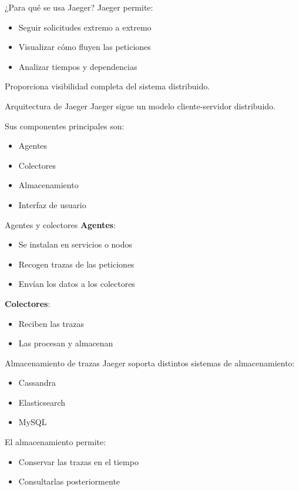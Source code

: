 \documentclass{beamer}
\begin{document}
\begin{frame}{¿Para qué se usa Jaeger?}
Jaeger permite:
\begin{itemize}
    \item Seguir solicitudes extremo a extremo
    \item Visualizar cómo fluyen las peticiones
    \item Analizar tiempos y dependencias
\end{itemize}

\vspace{0.3cm}
Proporciona visibilidad completa del sistema distribuido.
\end{frame}

\begin{frame}{Arquitectura de Jaeger}
Jaeger sigue un modelo cliente-servidor distribuido.

\vspace{0.3cm}
Sus componentes principales son:
\begin{itemize}
    \item Agentes
    \item Colectores
    \item Almacenamiento
    \item Interfaz de usuario
\end{itemize}
\end{frame}

\begin{frame}{Agentes y colectores}
\textbf{Agentes}:
\begin{itemize}
    \item Se instalan en servicios o nodos
    \item Recogen trazas de las peticiones
    \item Envían los datos a los colectores
\end{itemize}

\vspace{0.3cm}
\textbf{Colectores}:
\begin{itemize}
    \item Reciben las trazas
    \item Las procesan y almacenan
\end{itemize}
\end{frame}

\begin{frame}{Almacenamiento de trazas}
Jaeger soporta distintos sistemas de almacenamiento:
\begin{itemize}
    \item Cassandra
    \item Elasticsearch
    \item MySQL
\end{itemize}

\vspace{0.3cm}
El almacenamiento permite:
\begin{itemize}
    \item Conservar las trazas en el tiempo
    \item Consultarlas posteriormente
\end{itemize}
\end{frame}
\end{document}
